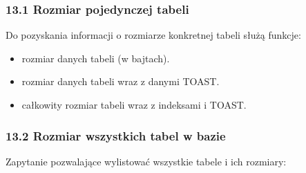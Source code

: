 \documentclass[letterpaper,10pt,polish]{sphinxmanual}
\begin{document}
\subsubsection{13.1 Rozmiar pojedynczej tabeli}
\label{\detokenize{rozdzial2/Konfiguracja_baz_danych/Konfiguracja_baz_danych:rozmiar-pojedynczej-tabeli}}
\sphinxAtStartPar
Do pozyskania informacji o rozmiarze konkretnej tabeli służą funkcje:
\begin{itemize}
\item {} 
\sphinxAtStartPar
{} \textendash{} rozmiar danych tabeli (w bajtach).

\item {} 
\sphinxAtStartPar
{} \textendash{} rozmiar danych tabeli wraz z danymi TOAST.

\item {} 
\sphinxAtStartPar
{} \textendash{} całkowity rozmiar tabeli wraz z indeksami i TOAST.

\end{itemize}

\sphinxAtStartPar
{}

\begin{sphinxVerbatim}[commandchars=\\\{\}]
    
    
    
\end{sphinxVerbatim}


\subsubsection{13.2 Rozmiar wszystkich tabel w bazie}
\label{\detokenize{rozdzial2/Konfiguracja_baz_danych/Konfiguracja_baz_danych:rozmiar-wszystkich-tabel-w-bazie}}
\sphinxAtStartPar
Zapytanie pozwalające wylistować wszystkie tabele i ich rozmiary:
\end{document}

